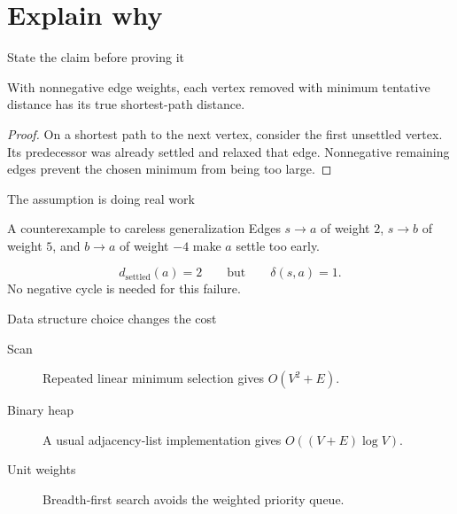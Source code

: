 \documentclass[11pt,aspectratio=43]{beamer}
\begin{document}
\section{Explain why}
\begin{frame}{State the claim before proving it}
\begin{theorem}
With nonnegative edge weights, each vertex removed with minimum tentative distance has its true shortest-path distance.
\end{theorem}
\pause
\begin{proof}
On a shortest path to the next vertex, consider the first unsettled vertex. Its predecessor was already settled and relaxed that edge. Nonnegative remaining edges prevent the chosen minimum from being too large.
\end{proof}
\end{frame}
\begin{frame}{The assumption is doing real work}
\begin{alertblock}{A counterexample to careless generalization}
Edges $s\to a$ of weight $2$, $s\to b$ of weight $5$, and $b\to a$ of weight $-4$ make $a$ settle too early.
\end{alertblock}
\[
  d_{\mathrm{settled}}(a)=2\qquad\text{but}\qquad\delta(s,a)=1.
\]
No negative cycle is needed for this failure.
\end{frame}
\begin{frame}{Data structure choice changes the cost}
\begin{description}
\item[Scan] Repeated linear minimum selection gives $O(V^2+E)$.
\item[Binary heap] A usual adjacency-list implementation gives $O((V+E)\log V)$.
\item[Unit weights] Breadth-first search avoids the weighted priority queue.
\end{description}
\end{frame}
\end{document}
